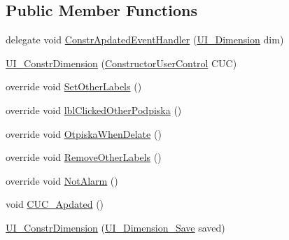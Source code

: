 \subsection*{Public Member Functions}
\begin{DoxyCompactItemize}
\item 
delegate void \mbox{\hyperlink{class_dimension___chain_1_1_u_i___constr_dimension_afb6b60fe4836094dcbf61d6347f94b24}{Constr\+Apdated\+Event\+Handler}} (\mbox{\hyperlink{class_dimension___chain_1_1_u_i___dimension}{U\+I\+\_\+\+Dimension}} dim)
\item 
\mbox{\hyperlink{class_dimension___chain_1_1_u_i___constr_dimension_a5a5a38f79b3822a6912010066cc1636b}{U\+I\+\_\+\+Constr\+Dimension}} (\mbox{\hyperlink{class_dimension___chain_1_1_constructor_user_control}{Constructor\+User\+Control}} C\+UC)
\item 
override void \mbox{\hyperlink{class_dimension___chain_1_1_u_i___constr_dimension_a9d4992d200a4fd5fde1b6dd6ccb03c91}{Set\+Other\+Labels}} ()
\item 
override void \mbox{\hyperlink{class_dimension___chain_1_1_u_i___constr_dimension_aacedc7ff420f11c4923787d58e116ef5}{lbl\+Clicked\+Other\+Podpiska}} ()
\item 
override void \mbox{\hyperlink{class_dimension___chain_1_1_u_i___constr_dimension_a3815be9b5b88d93c7912b14b4a61d587}{Otpiska\+When\+Delate}} ()
\item 
override void \mbox{\hyperlink{class_dimension___chain_1_1_u_i___constr_dimension_a376e3dccaacd2f13db6da8a7012ae0ad}{Remove\+Other\+Labels}} ()
\item 
override void \mbox{\hyperlink{class_dimension___chain_1_1_u_i___constr_dimension_ae763eed5acf7a38c8d7c6cb3734ffb16}{Not\+Alarm}} ()
\item 
void \mbox{\hyperlink{class_dimension___chain_1_1_u_i___constr_dimension_a8b994f742a4dca8a4accf2a3d3ebd809}{C\+U\+C\+\_\+\+Apdated}} ()
\item 
\mbox{\hyperlink{class_dimension___chain_1_1_u_i___constr_dimension_aed60aa3fee914ad924b29c5d65bcd463}{U\+I\+\_\+\+Constr\+Dimension}} (\mbox{\hyperlink{class_dimension___chain_1_1_u_i___dimension___save}{U\+I\+\_\+\+Dimension\+\_\+\+Save}} saved)
\end{DoxyCompactItemize}
